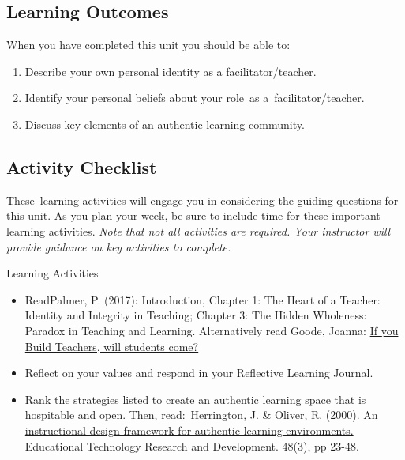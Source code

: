 \documentclass[
]{book}
\providecommand{\tightlist}{%
  \setlength{\itemsep}{0pt}\setlength{\parskip}{0pt}}
\begin{document}
\hypertarget{learning-outcomes}{%
\subsection*{Learning Outcomes}\label{learning-outcomes}}

When you have completed this unit you should be able to:

\begin{enumerate}
\def\labelenumi{\arabic{enumi}.}
\tightlist
\item
  Describe your own personal identity as a facilitator/teacher.\\
\item
  Identify your personal beliefs about your role~as a~facilitator/teacher.\\
\item
  Discuss key elements of an authentic learning community.
\end{enumerate}

\hypertarget{activity-checklist}{%
\subsection*{Activity Checklist}\label{activity-checklist}}

These~learning activities will engage you in considering the guiding questions for this unit. As you plan your week, be sure to include time for these important learning activities. \emph{Note that not all activities are required. Your instructor will provide guidance on key activities to complete.}

\begin{reflect}
{Learning Activities}

\begin{itemize}
\tightlist
\item
  ReadPalmer, P. (2017): Introduction, Chapter 1: The Heart of a
  Teacher: Identity and Integrity in Teaching; Chapter 3: The Hidden
  Wholeness: Paradox in Teaching and Learning. Alternatively read Goode,
  Joanna:
  \href{https://journals-sagepub-com.twu.idm.oclc.org/doi/pdf/10.2190/2102-5G77-QL77-5506}{If
  you Build Teachers, will students come?}\\
\item
  Reflect on your values and respond in your Reflective Learning
  Journal.\\
\item
  Rank the strategies listed to create an authentic learning space that
  is hospitable and open. Then, read:~Herrington, J. \& Oliver, R.
  (2000). \href{https://ro.uow.edu.au/edupapers/31/}{An instructional
  design framework for authentic learning environments.} Educational
  Technology Research and Development. 48(3), pp 23-48.
\end{itemize}
\end{reflect}
\end{document}
